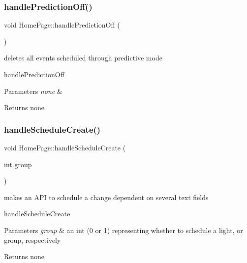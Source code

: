 \subsubsection{\texorpdfstring{handle\+Prediction\+Off()}{handlePredictionOff()}}
{\footnotesize\ttfamily void Home\+Page\+::handle\+Prediction\+Off (\begin{DoxyParamCaption}{ }\end{DoxyParamCaption})\hspace{0.3cm}{\ttfamily [private]}}



deletes all events scheduled through predictive mode 

handle\+Prediction\+Off 
\begin{DoxyParams}{Parameters}
{\em none} & \\
\hline
\end{DoxyParams}
\begin{DoxyReturn}{Returns}
none 
\end{DoxyReturn}
\mbox{\label{class_home_page_ad43b3bb765e485771e9116edbcec0b2b}} 
\subsubsection{\texorpdfstring{handle\+Schedule\+Create()}{handleScheduleCreate()}}
{\footnotesize\ttfamily void Home\+Page\+::handle\+Schedule\+Create (\begin{DoxyParamCaption}\item[{int}]{group }\end{DoxyParamCaption})\hspace{0.3cm}{\ttfamily [private]}}



makes an A\+PI to schedule a change dependent on several text fields 

handle\+Schedule\+Create 
\begin{DoxyParams}{Parameters}
{\em group} & an int (0 or 1) representing whether to schedule a light, or group, respectively \\
\hline
\end{DoxyParams}
\begin{DoxyReturn}{Returns}
none 
\end{DoxyReturn}
\mbox{\label{class_home_page_a2e1ef1f628cf82023a688fabfc272bff}} 
